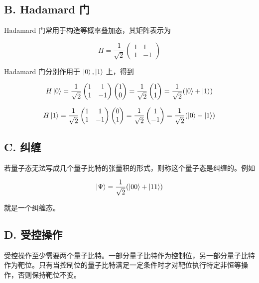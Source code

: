 \documentclass[aps,prl,twocolumn,groupedaddress]{revtex4-2}
\begin{document}
\subsection{B. Hadamard 门}

Hadamard 门常用于构造等概率叠加态，其矩阵表示为

$$
H=\frac{1 }{\sqrt{2} } \begin{pmatrix}
1 &1 \\
1 &-1
\end{pmatrix}
$$

Hadamard 门分别作用于 $\ket{0},\ket{1}$ 上，得到

$$
H\ket{0}
=\frac{1 }{\sqrt{2} }
\begin{pmatrix}
1 &1 \\
1 &-1
\end{pmatrix}
\begin{pmatrix}
1 \\
0
\end{pmatrix}
=\frac{1 }{\sqrt{2} }
\begin{pmatrix}
1 \\
1
\end{pmatrix}
=\frac{1 }{\sqrt{2} } (\ket{0}+\ket{1})
$$

$$
H\ket{1}
=\frac{1 }{\sqrt{2} }
\begin{pmatrix}
1 &1 \\
1 &-1
\end{pmatrix}
\begin{pmatrix}
0 \\
1
\end{pmatrix}
=\frac{1 }{\sqrt{2} }
\begin{pmatrix}
1 \\
-1
\end{pmatrix}
=\frac{1 }{\sqrt{2} } (\ket{0}-\ket{1})
$$

\subsection{C. 纠缠}

若量子态无法写成几个量子比特的张量积的形式，则称这个量子态是纠缠的。例如

$$
\ket{\Psi}=\frac{1 }{\sqrt{2} } (\ket{00}+\ket{11})
$$

就是一个纠缠态。

\subsection{D. 受控操作}

受控操作至少需要两个量子比特。一部分量子比特作为控制位，另一部分量子比特作为靶位。只有当控制位的量子比特满足一定条件时才对靶位执行特定非恒等操作，否则保持靶位不变。
\end{document}
